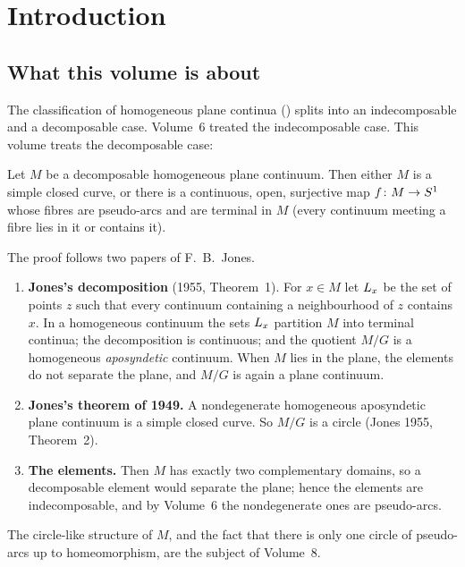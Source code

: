 \chapter{Introduction}\label{ch:intro}

\section{What this volume is about}

The classification of homogeneous plane continua () splits into an indecomposable and a decomposable case. Volume~6
treated the indecomposable case. This volume treats the decomposable case:

\begin{theorem}
Let $M$ be a decomposable homogeneous plane continuum. Then either $M$ is a simple closed curve, or there is a continuous, open, surjective map
$f\colon M\to S^1$ whose fibres are pseudo-arcs and are terminal in $M$ (every continuum meeting a fibre lies in it or contains it).
\end{theorem}

The proof follows two papers of F.~B.~Jones.
\begin{enumerate}
\item \textbf{Jones's decomposition} (1955, Theorem~1). For $x\in M$ let $L_{x}$ be the set of points $z$ such that every continuum containing a
neighbourhood of $z$ contains $x$. In a homogeneous continuum the sets $L_{x}$ partition $M$ into terminal continua; the decomposition is continuous;
and the quotient $M/G$ is a homogeneous \emph{aposyndetic} continuum. When $M$ lies in the plane, the elements do not separate the plane, and $M/G$
is again a plane continuum.
\item \textbf{Jones's theorem of 1949.} A nondegenerate homogeneous aposyndetic plane continuum is a simple closed curve. So $M/G$ is a circle
(Jones 1955, Theorem~2).
\item \textbf{The elements.} Then $M$ has exactly two complementary domains, so a decomposable element would separate the plane; hence the elements are
indecomposable, and by Volume~6 the nondegenerate ones are pseudo-arcs.
\end{enumerate}
The circle-like structure of $M$, and the fact that there is only one circle of pseudo-arcs up to homeomorphism, are the subject of Volume~8.


